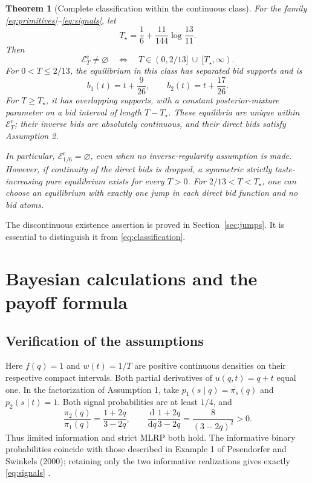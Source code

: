 \documentclass[11pt,a4paper]{article}
\numberwithin{equation}{section}
\newtheorem{theorem}{Theorem}[section]
\theoremstyle{definition}
\theoremstyle{remark}
\newcommand{\Ts}{T_\star}
\newcommand{\Ec}{\mathcal E_T^{\mathrm{c}}}
\begin{document}
\begin{theorem}[Complete classification within the continuous class]
\label{thm:main}
For the family \eqref{eq:primitives}--\eqref{eq:signals}, let
\begin{equation}
\label{eq:Tstar}
\Ts=\frac16+\frac{11}{144}\log\!\frac{13}{11}.
\end{equation}
Then
\begin{equation}
\label{eq:classification}
\Ec\ne\varnothing
\quad\Longleftrightarrow\quad
T\in(0,2/13]\ \cup\ [\Ts,\infty).
\end{equation}
For $0<T\le2/13$, the equilibrium in this class has separated bid supports and is
\[
 b_1(t)=t+\frac9{26},\qquad b_2(t)=t+\frac{17}{26}.
\]
For $T\ge\Ts$, it has overlapping supports, with a constant posterior-mixture parameter on a bid interval of length $T-\Ts$. These equilibria are unique within $\Ec$; their inverse bids are absolutely continuous, and their direct bids satisfy Assumption 2.

In particular, $\mathcal E_{1/6}^{\mathrm c}=\varnothing$, even when no inverse-regularity assumption is made. However, if continuity of the \emph{direct} bids is dropped, a symmetric strictly taste-increasing pure equilibrium exists for \emph{every} $T>0$. For $2/13<T<\Ts$, one can choose an equilibrium with exactly one jump in each direct bid function and no bid atoms.
\end{theorem}

The discontinuous existence assertion is proved in Section~\ref{sec:jumps}. It is essential to distinguish it from \eqref{eq:classification}.

\section{Bayesian calculations and the payoff formula}
\label{sec:bayes}

\subsection{Verification of the assumptions}
Here $f(q)=1$ and $w(t)=1/T$ are positive continuous densities on their respective compact intervals. Both partial derivatives of $u(q,t)=q+t$ equal one. In the factorization of Assumption 1, take $p_1(s\mid q)=\pi_s(q)$ and $p_2(s\mid t)=1$. Both signal probabilities are at least $1/4$, and
\[
\frac{\pi_2(q)}{\pi_1(q)}=\frac{1+2q}{3-2q},\qquad
\frac{\mathrm d}{\mathrm dq}\frac{1+2q}{3-2q}
=\frac8{(3-2q)^2}>0.
\]
Thus limited information and strict MLRP both hold. The informative binary probabilities coincide with those described in Example 1 of Pesendorfer and Swinkels (2000); retaining only the two informative realizations gives exactly \eqref{eq:signals} \cite[p.~503]{PS2000}.
\end{document}
